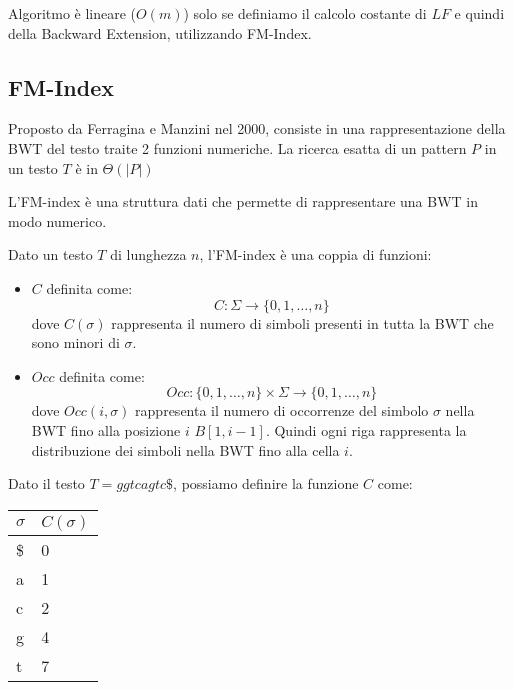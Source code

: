 Algoritmo è lineare ($O(m)$) solo se definiamo il calcolo costante di $LF$ e quindi
della Backward Extension, utilizzando FM-Index.
\subsection{FM-Index}
Proposto da Ferragina e Manzini nel 2000, consiste in una rappresentazione della
BWT del testo traite 2 funzioni numeriche. La ricerca esatta di un pattern $P$ in
un testo $T$ è in $\Theta(|P|)$

L'FM-index è una struttura dati che permette di rappresentare una BWT in modo
numerico.
\begin{definizione}
    Dato un testo $T$ di lunghezza $n$, l'FM-index è una coppia di funzioni:
    \begin{itemize}
        \item $C$ definita come:
              \begin{equation}
                  C: \Sigma \to \{0, 1, \dots, n\}
              \end{equation}
              dove $C(\sigma)$ rappresenta il numero di simboli presenti in tutta la BWT che sono
              minori di $\sigma$.
        \item $Occ$ definita come:
              \begin{equation}
                  Occ: \{0, 1, \dots, n\} \times \Sigma \to \{0, 1, \dots, n\}
              \end{equation}
              dove $Occ(i, \sigma)$ rappresenta il numero di occorrenze del simbolo
              $\sigma$ nella BWT fino alla posizione $i$ $B[1, i - 1]$. Quindi ogni
              riga rappresenta la distribuzione dei simboli nella BWT fino alla
              cella $i$.
    \end{itemize}
\end{definizione}
\begin{esempio}
    Dato il testo $T=ggtcagtc\$$, possiamo definire la funzione $C$ come:
    \begin{table}[!ht]
        \centering
        \begin{tabular}{|l|l|}
            \hline
            $\sigma$ & $C(\sigma)$ \\ \hline
            \$       & 0           \\ \hline
            a        & 1           \\ \hline
            c        & 2           \\ \hline
            g        & 4           \\ \hline
            t        & 7           \\ \hline
        \end{tabular}
    \end{table}
\end{esempio}
